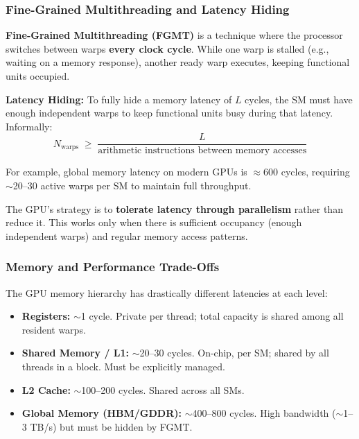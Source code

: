 \subsubsection{Fine-Grained Multithreading and Latency Hiding}

\begin{definition}
    \textbf{Fine-Grained Multithreading (FGMT)} is a technique where the processor switches between warps \textbf{every clock cycle}. While one warp is stalled (e.g., waiting on a memory response), another ready warp executes, keeping functional units occupied.
\end{definition}


\begin{theorem}
    \textbf{Latency Hiding:} To fully hide a memory latency of $L$ cycles, the SM must have enough independent warps to keep functional units busy during that latency. Informally:
    $$N_{\text{warps}} \;\geq\; \frac{L}{\text{arithmetic instructions between memory accesses}}$$
\end{theorem}

\begin{example}
        For example, global memory latency on modern GPUs is $\approx 600$ cycles, requiring $\sim$20--30 active warps per SM to maintain full throughput.
\end{example}

\begin{important}
    The GPU's strategy is to \textbf{tolerate latency through parallelism} rather than reduce it. This works only when there is sufficient occupancy (enough independent warps) and regular memory access patterns.
\end{important}


\subsubsection{Memory and Performance Trade-Offs}

\begin{remark}
    The GPU memory hierarchy has drastically different latencies at each level:
    \begin{itemize}
        \item \textbf{Registers:} $\sim$1 cycle. Private per thread; total capacity is shared among all resident warps.
        \item \textbf{Shared Memory / L1:} $\sim$20--30 cycles. On-chip, per SM; shared by all threads in a block. Must be explicitly managed.
        \item \textbf{L2 Cache:} $\sim$100--200 cycles. Shared across all SMs.
        \item \textbf{Global Memory (HBM/GDDR):} $\sim$400--800 cycles. High bandwidth ($\sim$1--3 TB/s) but must be hidden by FGMT.
    \end{itemize}
\end{remark}

